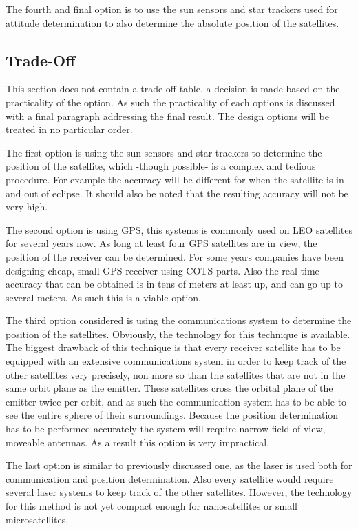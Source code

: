 The fourth and final option is to use the sun sensors and star trackers used for attitude determination to also determine the absolute position of the satellites.

\subsection{Trade-Off}
\label{navi2}
This section does not contain a trade-off table, a decision is made based on the practicality of the option. As such the practicality of each options is discussed with a final paragraph addressing the final result. The design options will be treated in no particular order.

The first option is using the sun sensors and star trackers to determine the position of the satellite, which -though possible- is a complex and tedious procedure. For example the accuracy will be different for when the satellite is in and out of eclipse. It should also be noted that the resulting accuracy will not be very high.

The second option is using \acs{GPS}, this systems is commonly used on \acs{LEO} satellites for several years now. As long at least four \acs{GPS} satellites are in view, the position of the receiver can be determined. For some years companies have been designing cheap, small GPS receiver using \acs{COTS} parts. Also the real-time accuracy that can be obtained is in tens of meters at least up, and can go up to several meters. As such this is a viable option.

The third option considered is using the communications system to determine the position of the satellites. Obviously, the technology for this technique is available. The biggest drawback of this technique is that every receiver satellite has to be equipped with an extensive communications system in order to keep track of the other satellites very precisely, non more so than the satellites that are not in the same orbit plane as the emitter. These satellites cross the orbital plane of the emitter twice per orbit, and as such the communication system has to be able to see the entire sphere of their surroundings. Because the position determination has to be performed accurately the system will require narrow field of view, moveable antennas. As a result this option is very impractical.

The last option is similar to previously discussed one, as the laser is used both for communication and position determination. Also every satellite would require several laser systems to keep track of the other satellites. However, the technology for this method is not yet compact enough for nanosatellites or small microsatellites.

